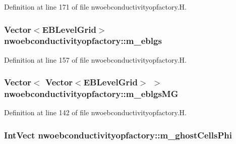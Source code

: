 Definition at line 171 of file nwoebconductivityopfactory.\+H.

\subsubsection[{\texorpdfstring{m\+\_\+eblgs}{m_eblgs}}]{\setlength{\rightskip}{0pt plus 5cm}Vector$<$E\+B\+Level\+Grid$>$ nwoebconductivityopfactory\+::m\+\_\+eblgs\hspace{0.3cm}{\ttfamily [protected]}}\hypertarget{classnwoebconductivityopfactory_a1abceca979866aec0b4e4d9dc9dc08b6}{}\label{classnwoebconductivityopfactory_a1abceca979866aec0b4e4d9dc9dc08b6}


Definition at line 157 of file nwoebconductivityopfactory.\+H.

\subsubsection[{\texorpdfstring{m\+\_\+eblgs\+MG}{m_eblgsMG}}]{\setlength{\rightskip}{0pt plus 5cm}Vector$<$ Vector$<$E\+B\+Level\+Grid$>$ $>$ nwoebconductivityopfactory\+::m\+\_\+eblgs\+MG\hspace{0.3cm}{\ttfamily [protected]}}\hypertarget{classnwoebconductivityopfactory_a3bf612961cbcfb5463794f3d30012be6}{}\label{classnwoebconductivityopfactory_a3bf612961cbcfb5463794f3d30012be6}


Definition at line 142 of file nwoebconductivityopfactory.\+H.

\subsubsection[{\texorpdfstring{m\+\_\+ghost\+Cells\+Phi}{m_ghostCellsPhi}}]{\setlength{\rightskip}{0pt plus 5cm}Int\+Vect nwoebconductivityopfactory\+::m\+\_\+ghost\+Cells\+Phi\hspace{0.3cm}{\ttfamily [protected]}}\hypertarget{classnwoebconductivityopfactory_a7894598ddddefae72cb1f5042694a5c9}{}\label{classnwoebconductivityopfactory_a7894598ddddefae72cb1f5042694a5c9}


